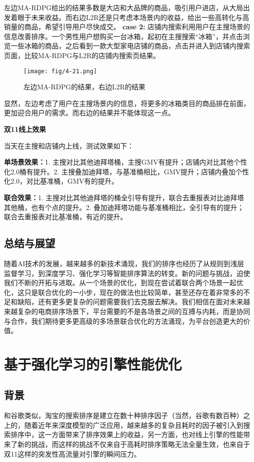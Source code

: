 左边MA-RDPG给出的结果多数是大店和大品牌的商品，吸引用户进店，从大局出发着眼于未来收益。而右边L2R还是只考虑本场景内的收益，给出一些高转化与高销量的商品，希望引导用户尽快成交。
\textbf{case 2:} 店铺内搜索利用用户在主搜场景的信息改善排序。一个男性用户想购买一台冰箱，起初在主搜搜索“冰箱”，并点击浏览一些冰箱的商品，之后看到一款大型家电店铺的商品，点击并进入到店铺内搜索页面，比较MA-RDPG与L2R的店铺内搜索页结果。
\begin{figure}[!h]
\centering
\texttt{[image: fig/4-21.png]}
\caption{ 左边MA-RDPG的结果，右边L2R的结果}
\end{figure}
显然，左边考虑了用户在主搜场景内的信息，将更多的冰箱类目的商品排在前面，更加迎合用户的需求。而右边的结果并不能体现这一点。

\textbf{双11线上效果}

当天在主搜和店铺内上线，测试效果如下：

\textbf{单场景效果：}1. 主搜对比其他迪拜塔桶，主搜GMV有{\color{red}{+2\%}}提升；店铺内对比其他个性化2.0桶有{\color{red}{0.74\%}}提升。2. 主搜叠加迪拜塔，与基准桶相比，GMV提升{\color{red}{+12.5\%}}；店铺内叠加个性化2.0，对比基准桶，GMV有{\color{red}{+9.4\%}}的提升。

\textbf{联合效果：}1. 主搜对比其他迪拜塔的桶全引导有{\color{red}{+3\%}}提升，联合去重报表对比迪拜塔其他桶，也有{\color{red}{1~2}}个点的提升。2. 叠加迪拜塔功能与基准桶相比，全引导有{\color{red}{+12.2\%}}的提升；联合去重报表对比基准桶，有近{\color{red}{+10\%}}的提升。

\subsection{总结与展望}
随着AI技术的发展，越来越多的新技术涌现，我们的排序也经历了从规则到浅层监督学习，到深度学习、强化学习等智能排序算法的转变。新的问题与挑战，迫使我们不断的开拓与进取。从一个场景的优化，到现在尝试着联合两个场景一起优化，这只是联合优化的一小步，现在的做法也比较简单，甚至还存在着非常多的不足和缺陷，还有更多更复杂的问题需要我们去克服去解决。我们相信在面对未来越来越复杂的电商排序场景下，平台需要的不是各场景之间的互搏与内耗，而是协同与合作，我们期待更多更高级的多场景联合优化的方法涌现，为平台创造更大的价值。



\section{基于强化学习的引擎性能优化} 
\subsection{背景}
和谷歌类似，淘宝的搜索排序是建立在数十种排序因子（当然，谷歌有数百种）之上的，随着近年来深度模型的广泛应用，越来越多的复杂且耗时的因子被引入到搜索排序中，这一方面带来了排序效果上的收益，另一方面，也对线上引擎的性能带来了新的挑战，而这样的挑战不仅来自于高耗时排序策略无法全量生效，也来自于双11这样的突发性高流量对引擎的瞬间压力。

